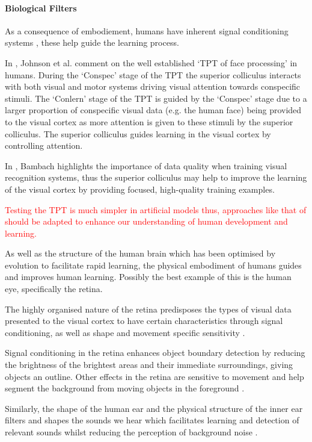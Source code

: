 \paragraph{Biological Filters}
As a consequence of embodiement, humans have inherent signal conditioning systems \cite{pezzulo2013computational}, these help guide the learning process.

In \cite{johnson2015two}, Johnson et al. comment on the well established `\ac{TPT} of face processing' in humans.  During the `Conspec' stage of the \ac{TPT} the superior colliculus interacts with both visual and motor systems driving visual attention towards conspecific stimuli. The `Conlern' stage of the \ac{TPT} is guided by the `Conspec' stage due to a larger proportion of conspecific visual data  (e.g. the human face) being provided to the visual cortex as more attention is given to these stimuli by the superior colliculus. 
The superior colliculus guides learning in the visual cortex by controlling attention.

In \cite{bambach2017egocentric}, Bambach highlights the importance of data quality when training visual recognition systems, thus the superior colliculus may help to improve the learning of the visual cortex by providing focused, high-quality training examples. 

\textcolor{red}{Testing the \ac{TPT} is much simpler in artificial models thus, approaches like that of \cite{bambach2017egocentric} should be adapted to enhance our understanding of human development and learning.}

As well as the structure of the human brain which has been optimised by evolution to facilitate rapid learning, the physical embodiment of humans guides and improves human learning. Possibly the best example of this is the human eye, specifically the retina.

The highly organised nature of the retina predisposes the types of visual data presented to the visual cortex to have certain characteristics through signal conditioning, as well as shape and movement specific sensitivity \cite{masland2012neuronal}.

Signal conditioning in the retina enhances object boundary detection by reducing the brightness of the brightest areas and their immediate surroundings, giving objects an outline. Other effects in the retina are sensitive to movement and help segment the background from moving objects in the foreground \cite{olveczky2003segregation}.

Similarly, the shape of the human ear and the physical structure of the inner ear filters and shapes the sounds we hear which facilitates learning and detection of relevant sounds whilst reducing the perception of background noise \cite{oxenham2018we}.

